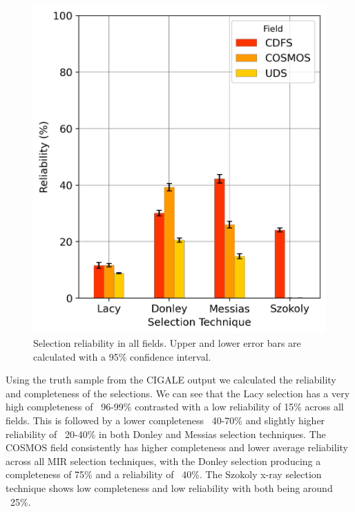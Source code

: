 \documentclass[11pt]{iopart}
\begin{document}
\begin{figure}
  \centering
  \includegraphics[width=0.90\linewidth]{plots/TechniqueReliability.png}
  \caption{Selection reliability in all fields. Upper and lower error bars are calculated with a 95\% confidence interval.}
  \label{fig:Completeness}
\end{figure}
\newpage
Using the truth sample from the CIGALE output we calculated the reliability and completeness of the selections. We can see that the Lacy selection has a very high completeness of ~96-99\% contrasted with a low reliability of 15\% across all fields. This is followed by a lower completeness ~40-70\% and slightly higher reliability of ~20-40\% in both Donley and Messias selection techniques. The COSMOS field consistently has higher completeness and lower average reliability across all MIR selection techniques, with the Donley selection producing a completeness of 75\% and a reliability of ~40\%. The Szokoly x-ray selection technique shows low completeness and low reliability with both being around ~25\%. 
\end{document}
